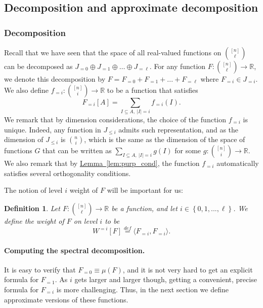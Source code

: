 \documentclass[11pt]{article}
\newcommand{\expref}[2]{\texorpdfstring{\hyperref[#2]{#1~\ref{#2}}}{#1~\ref{#2}}}
\newtheorem{definition}[theorem]{Definition}
\newcommand\card[1]{\left| {#1} \right|}
\newcommand\set[1]{{\left\{ #1 \right\}}}
\newcommand\defeq{\stackrel{def}{=}}
\newcommand\inner[2]{\langle{#1},{#2}\rangle}
\newcommand\xor{\oplus}
\renewcommand\leq{\leqslant}
\newcommand\lvlfn[2]{{#1}_{={#2}}}
\begin{document}
\subsection{Decomposition and approximate decomposition}
\subsubsection{Decomposition}
Recall that we have seen that the space of all real-valued functions on ${[n]\choose \ell}$
can be decomposed as $J_{=0}\xor J_{=1}\xor\ldots\xor J_{=\ell}$. For any function $F\colon {[n] \choose \ell}\to\mathbb{R}$, we denote this decomposition by $F=\lvlfn{F}{0}+\lvlfn{F}{1}+...+\lvlfn{F}{\ell}$ where $\lvlfn{F}{i}\in J_{=i}$.
We also define $\lvlfn{f}{i}\colon {[n] \choose i}\to\mathbb{R}$ to be a function that satisfies
\[
\lvlfn{F}{i}[A] = \sum\limits_{I\subseteq A,~\card{I} = i}{\lvlfn{f}{i}(I)}.
\]
We remark that by dimension considerations, the choice of the function $\lvlfn{f}{i}$ is unique. Indeed,
any function in $J_{\leq i}$ admits such representation, and as the dimension of $J_{\leq i}$ is $\binom{n}{i}$,
which is the same as the dimension of the space of functions $G$ that can be written as
$\sum\limits_{I\subseteq A,~\card{I} = i}{g(I)}$ for some $g\colon \binom{[n]}{i}\to\mathbb{R}$.
We also remark that by \expref{Lemma}{lem:purp_cond}, the function $\lvlfn{f}{i}$ automatically satisfies several orthogonality
conditions.

The notion of level $i$ weight of $F$ will be important for us:
\begin{definition}
Let $F\colon {[n]\choose \ell}\to\mathbb{R}$ be a function, and let $i\in\set{0,1,...,\ell}$. We define the weight
of $F$ on level $i$ to be
\[
W^{=i}[F] \defeq \inner{\lvlfn{F}{i}}{\lvlfn{F}{i}}.
\]
%
\end{definition}


\paragraph{Computing the spectral decomposition.}
It is easy to verify that $\lvlfn{F}{0}\equiv \mu(F)$, and it is not very hard to get an explicit formula for $\lvlfn{F}{1}$.
As $i$ gets larger and larger though, getting a convenient, precise formula for $\lvlfn{F}{i}$ is more challenging. Thus,
in the next section we define approximate versions of these functions.
\end{document}
